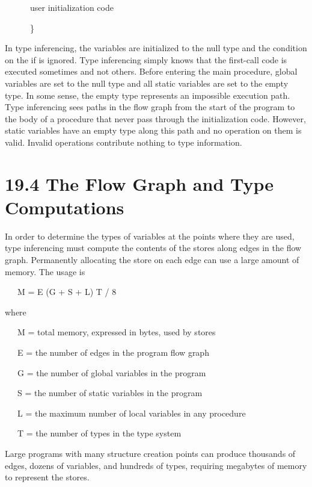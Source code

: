 {\ttfamily\mdseries
\ \ \ \ \ \ user initialization code}

{\ttfamily\mdseries
\ \ \ \ \ \ \}}

In type inferencing, the variables are initialized to the null type
and the condition on the if is ignored. Type inferencing simply knows
that the first-call code is executed sometimes and not others. Before
entering the main procedure, global variables are set to the null type
and all static variables are set to the empty type. In some sense, the
empty type represents an impossible execution path. Type inferencing
sees paths in the flow graph from the start of the program to the body
of a procedure that never pass through the initialization
code. However, static variables have an empty type along this path and
no operation on them is valid. Invalid operations contribute nothing
to type information.


\section[19.4 The Flow Graph and Type Computations]{19.4 The Flow Graph and Type Computations}

In order to determine the types of variables at the points where they
are used, type inferencing must compute the contents of the stores
along edges in the flow graph. Permanently allocating the store on
each edge can use a large amount of memory. The usage is

{\ttfamily\mdseries
\ \ \ M = E (G + S + L) T / 8}

\noindent where 

{\ttfamily\mdseries
\ \ \ M = total memory, expressed in bytes, used by stores}

{\ttfamily\mdseries
\ \ \ E = the number of edges in the program flow graph}

{\ttfamily\mdseries
\ \ \ G = the number of global variables in the program}

{\ttfamily\mdseries
\ \ \ S = the number of static variables in the program}

{\ttfamily\mdseries
\ \ \ L = the maximum number of local variables in any procedure}

{\ttfamily\mdseries
\ \ \ T = the number of types in the type system}

Large programs with many structure creation points can produce
thousands of edges, dozens of variables, and hundreds of types,
requiring megabytes of memory to represent the stores.

